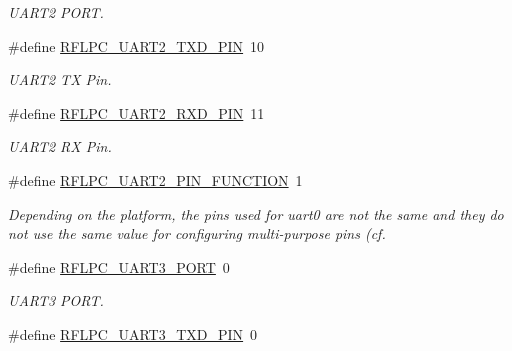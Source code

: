 \begin{DoxyCompactItemize}
\begin{DoxyCompactList}\small\item\em U\-A\-R\-T2 P\-O\-R\-T. \end{DoxyCompactList}\item 
\hypertarget{group__config_ga7fb82741537cdfd04bb47663c3f51859}{\#define \hyperlink{group__config_ga7fb82741537cdfd04bb47663c3f51859}{R\-F\-L\-P\-C\-\_\-\-U\-A\-R\-T2\-\_\-\-T\-X\-D\-\_\-\-P\-I\-N}~10}\label{group__config_ga7fb82741537cdfd04bb47663c3f51859}

\begin{DoxyCompactList}\small\item\em U\-A\-R\-T2 T\-X Pin. \end{DoxyCompactList}\item 
\hypertarget{group__config_ga48508620183c256d73ea0e6cd27e8832}{\#define \hyperlink{group__config_ga48508620183c256d73ea0e6cd27e8832}{R\-F\-L\-P\-C\-\_\-\-U\-A\-R\-T2\-\_\-\-R\-X\-D\-\_\-\-P\-I\-N}~11}\label{group__config_ga48508620183c256d73ea0e6cd27e8832}

\begin{DoxyCompactList}\small\item\em U\-A\-R\-T2 R\-X Pin. \end{DoxyCompactList}\item 
\#define \hyperlink{group__config_ga407dd3739a66a95a6252951ec28b7ae0}{R\-F\-L\-P\-C\-\_\-\-U\-A\-R\-T2\-\_\-\-P\-I\-N\-\_\-\-F\-U\-N\-C\-T\-I\-O\-N}~1
\begin{DoxyCompactList}\small\item\em Depending on the platform, the pins used for uart0 are not the same and they do not use the same value for configuring multi-\/purpose pins (cf. \end{DoxyCompactList}\item 
\hypertarget{group__config_gae693d2010094f1d87d124a7888758645}{\#define \hyperlink{group__config_gae693d2010094f1d87d124a7888758645}{R\-F\-L\-P\-C\-\_\-\-U\-A\-R\-T3\-\_\-\-P\-O\-R\-T}~0}\label{group__config_gae693d2010094f1d87d124a7888758645}

\begin{DoxyCompactList}\small\item\em U\-A\-R\-T3 P\-O\-R\-T. \end{DoxyCompactList}\item 
\hypertarget{group__config_ga9f0d2ed7c6a82bc0abdb2a29f63ff5dc}{\#define \hyperlink{group__config_ga9f0d2ed7c6a82bc0abdb2a29f63ff5dc}{R\-F\-L\-P\-C\-\_\-\-U\-A\-R\-T3\-\_\-\-T\-X\-D\-\_\-\-P\-I\-N}~0}\label{group__config_ga9f0d2ed7c6a82bc0abdb2a29f63ff5dc}


\end{DoxyCompactItemize}
